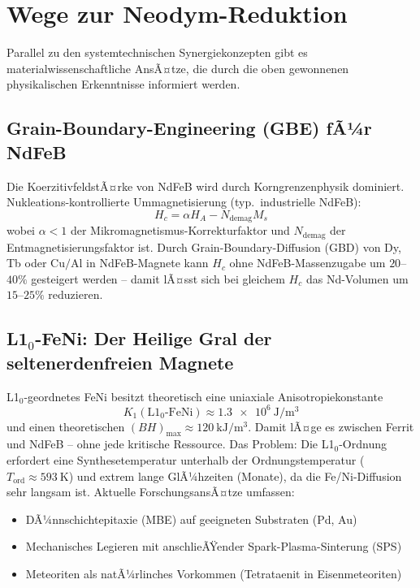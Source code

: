 ﻿\documentclass[12pt, a4paper]{report}
\theoremstyle{definition}
\theoremstyle{remark}
\begin{document}
\section{Wege zur Neodym-Reduktion}
\label{ssec:material_wege}

Parallel zu den systemtechnischen Synergiekonzepten gibt es materialwissenschaftliche
AnsÃ¤tze, die durch die oben gewonnenen physikalischen Erkenntnisse informiert werden.

\subsection{Grain-Boundary-Engineering (GBE) fÃ¼r NdFeB}

Die KoerzitivfeldstÃ¤rke von NdFeB wird durch Korngrenzenphysik dominiert.
Nukleations-kontrollierte Ummagnetisierung (typ.\ industrielle NdFeB):
\begin{equation}
  H_c = \alpha H_A - N_{\text{demag}} M_s
  \label{eq:Hc_nukleation}
\end{equation}
wobei $\alpha < 1$ der Mikromagnetismus-Korrekturfaktor und $N_{\text{demag}}$
der Entmagnetisierungsfaktor ist. Durch Grain-Boundary-Diffusion (GBD) von Dy,
Tb oder $\text{Cu/Al}$ in NdFeB-Magnete kann $H_c$ ohne NdFeB-Massenzugabe um
$20$--$40\%$ gesteigert werden -- damit lÃ¤sst sich bei gleichem $H_c$ das
Nd-Volumen um $15$--$25\%$ reduzieren.

\subsection{\texorpdfstring{L1$_0$-FeNi: Der Heilige Gral der seltenerdenfreien Magnete}{L10-FeNi: Der Heilige Gral der seltenerdenfreien Magnete}}

L1$_0$-geordnetes FeNi besitzt theoretisch eine uniaxiale Anisotropiekonstante
\begin{equation}
  K_1(\text{L1}_0\text{-FeNi}) \approx \SI{1.3e6}{\joule\per\cubic\metre}
  \label{eq:K1_FeNi}
\end{equation}
und einen theoretischen $(BH)_{\max} \approx \SI{120}{\kilo\joule\per\cubic\metre}$.
Damit lÃ¤ge es zwischen Ferrit und NdFeB -- ohne jede kritische Ressource.
Das Problem: Die L1$_0$-Ordnung erfordert eine Synthesetemperatur unterhalb der
Ordnungstemperatur ($T_{\text{ord}} \approx \SI{593}{\kelvin}$) und extrem lange
GlÃ¼hzeiten (Monate), da die Fe/Ni-Diffusion sehr langsam ist. Aktuelle
ForschungsansÃ¤tze umfassen:
\begin{itemize}
  \item DÃ¼nnschichtepitaxie (MBE) auf geeigneten Substraten (Pd, Au)
  \item Mechanisches Legieren mit anschlieÃŸender Spark-Plasma-Sinterung (SPS)
  \item Meteoriten als natÃ¼rlinches Vorkommen (Tetrataenit in Eisenmeteoriten)
\end{itemize}
\end{document}

